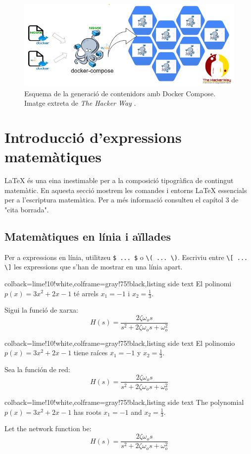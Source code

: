   \begin{figure}[H]
    \centering
    \includegraphics[width=1\textwidth]{img/DockerFig.png}
    \caption{Esquema de la generació de contenidors amb Docker Compose. Imatge extreta de \textit{The Hacker Way} \cite{miottaupcfig}.}
    \label{fig:MQTT2}
  \end{figure}

\section{Introducció d'expressions matemàtiques}
  
\LaTeX{} és una eina inestimable per a la composició tipogràfica de contingut matemàtic. En aquesta secció mostrem les comandes i entorns \LaTeX{} essencials per a l'escriptura matemàtica. Per a més informació consulteu el capítol 3 de "cita borrada".
  
\subsection{Matemàtiques en línia i aïllades}
  
Per a expressions en línia, utilitzeu \verb|$ ... $| o \verb|\( ... \)|. Escriviu entre \verb|\[ ... \]| les expressions que s'han de mostrar en una línia apart.


\ifcase\doclanguage\or
\begin{tcblisting}{colback=lime!10!white,colframe=gray!75!black,listing side text}
El polinomi $p(x) = 3x^2+2x-1$ t\'{e} arrels $x_1=-1$ i $x_2=\frac{1}{3}$.

Sigui la funci\'{o} de xarxa:
\[ H(s) = \frac{2\zeta\omega_o s}{s^2 + 2\zeta\omega_o s + \omega_o^2} \]
\end{tcblisting}%
%
\or
\begin{tcblisting}{colback=lime!10!white,colframe=gray!75!black,listing side text}
El polinomio $p(x) = 3x^2+2x-1$ tiene ra\'{i}ces $x_1=-1$ y $x_2=\frac{1}{3}$.

Sea la funci\'{o}n de red:
\[ H(s) = \frac{2\zeta\omega_o s}{s^2 + 2\zeta\omega_o s + \omega_o^2} \]
\end{tcblisting}
%
\else
\begin{tcblisting}{colback=lime!10!white,colframe=gray!75!black,listing side text}
The polynomial $p(x) = 3x^2 + 2x - 1$ has roots $x_1 = -1$ and $x_2 = \frac{1}{3}$.

Let the network function be:
\[ H(s) = \frac{2\zeta\omega_o s}{s^2 + 2\zeta\omega_o s + \omega_o^2} \]
\end{tcblisting}
\fi

